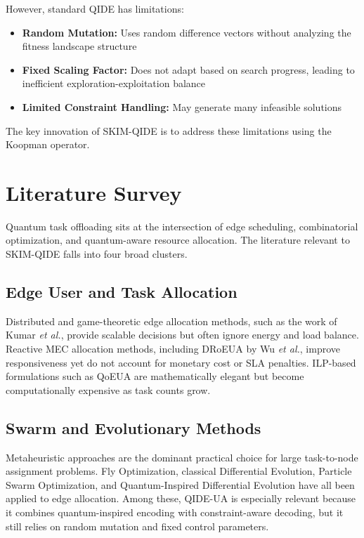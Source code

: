 \documentclass[12pt,a4paper]{article}
\begin{document}
However, standard QIDE has limitations:
\begin{itemize}
  \item \textbf{Random Mutation:} Uses random difference vectors without analyzing the fitness landscape structure
  \item \textbf{Fixed Scaling Factor:} Does not adapt based on search progress, leading to inefficient exploration-exploitation balance
  \item \textbf{Limited Constraint Handling:} May generate many infeasible solutions
\end{itemize}

The key innovation of SKIM-QIDE is to address these limitations using the Koopman operator.

\section{Literature Survey}

Quantum task offloading sits at the intersection of edge scheduling, combinatorial optimization, and quantum-aware resource allocation. The literature relevant to SKIM-QIDE falls into four broad clusters.

\subsection{Edge User and Task Allocation}
Distributed and game-theoretic edge allocation methods, such as the work of Kumar \textit{et al.}, provide scalable decisions but often ignore energy and load balance. Reactive MEC allocation methods, including DRoEUA by Wu \textit{et al.}, improve responsiveness yet do not account for monetary cost or SLA penalties. ILP-based formulations such as QoEUA are mathematically elegant but become computationally expensive as task counts grow.

\subsection{Swarm and Evolutionary Methods}
Metaheuristic approaches are the dominant practical choice for large task-to-node assignment problems. Fly Optimization, classical Differential Evolution, Particle Swarm Optimization, and Quantum-Inspired Differential Evolution have all been applied to edge allocation. Among these, QIDE-UA is especially relevant because it combines quantum-inspired encoding with constraint-aware decoding, but it still relies on random mutation and fixed control parameters.
\end{document}
